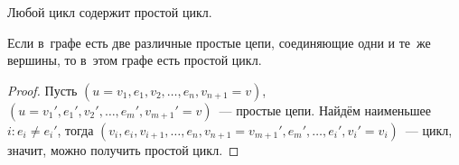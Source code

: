\begin{consequent}
Любой цикл содержит простой цикл.
\end{consequent}
	
\begin{lemma}
\label{lemma:existence_of_simple_cycle}
Если в~графе есть две различные простые цепи, соединяющие одни и те~же вершины, то в~этом графе есть простой цикл.
\end{lemma}
\begin{proof}
Пусть $(u = v_1, e_1, v_2, \ldots, e_n, v_{n+1} = v)$, $(u = v_1', e_1', v_2', \ldots, e_m', v_{m+1}' = v)$~--- простые цепи.
Найдём наименьшее~$i \colon e_i \neq e_i'$, тогда $(v_i, e_i, v_{i+1}, \ldots, e_n, v_{n+1} = v_{m+1}', e_m', \ldots, e_i', v_i' = v_i)$~--- цикл, значит, можно получить простой цикл.
\end{proof}